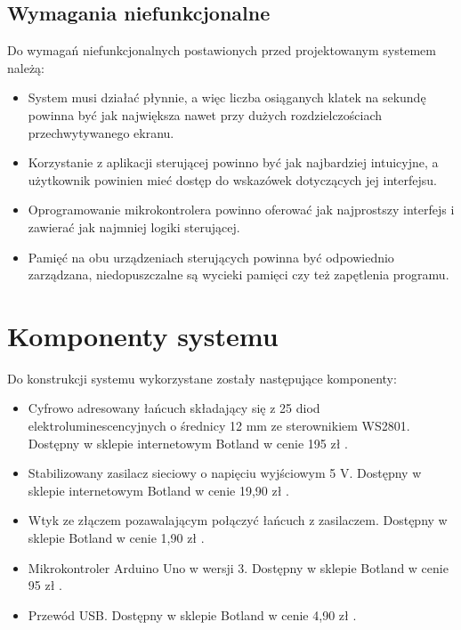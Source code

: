 \documentclass[12pt]{report}
\begin{document}
\subsection{Wymagania niefunkcjonalne}

Do wymagań niefunkcjonalnych postawionych przed projektowanym systemem należą:

\begin{itemize}
\item System musi działać płynnie, a więc liczba osiąganych klatek na sekundę powinna być jak największa nawet przy dużych rozdzielczościach przechwytywanego ekranu.
\item Korzystanie z aplikacji sterującej powinno być jak najbardziej intuicyjne, a użytkownik powinien mieć dostęp do wskazówek dotyczących jej interfejsu.
\item Oprogramowanie mikrokontrolera powinno oferować jak najprostszy interfejs i zawierać jak najmniej logiki sterującej.
\item Pamięć na obu urządzeniach sterujących powinna być odpowiednio zarządzana, niedopuszczalne są wycieki pamięci czy też zapętlenia programu.
\end{itemize}

\section{Komponenty systemu} \label{komp}

Do konstrukcji systemu wykorzystane zostały następujące komponenty:

\begin{itemize}
	\item Cyfrowo adresowany łańcuch składający się z 25 diod elektroluminescencyjnych o średnicy 12 mm ze sterownikiem WS2801. Dostępny w sklepie internetowym Botland w cenie 195 zł \cite{diody}.
	\item Stabilizowany zasilacz sieciowy o napięciu wyjściowym 5 V. Dostępny w sklepie internetowym Botland w cenie 19,90 zł \cite{zasilacz}.
	\item Wtyk ze złączem pozawalającym połączyć łańcuch z zasilaczem. Dostępny w sklepie Botland w cenie 1,90 zł \cite{wtyk}.
	\item Mikrokontroler Arduino Uno w wersji 3. Dostępny w sklepie Botland w cenie 95 zł \cite{arduino}.
	\item Przewód USB. Dostępny w sklepie Botland w cenie 4,90 zł \cite{usb}.
\end{itemize}
\end{document}
